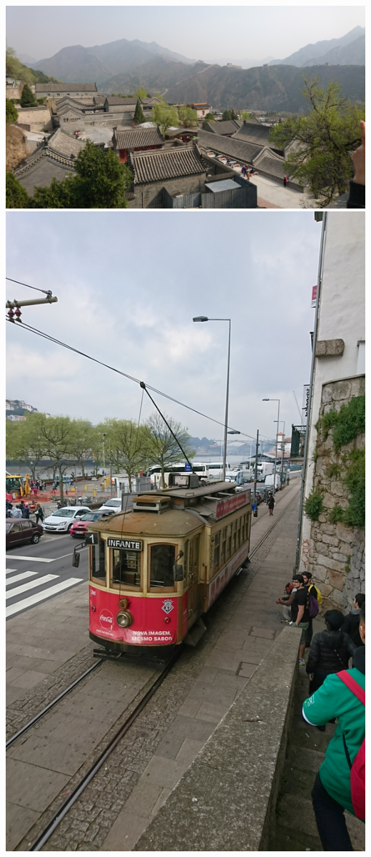 \documentclass{beamer}
\begin{document}
\begin{frame}
\begin{columns}
  \includegraphics[width=1\textwidth]{icpc/DSC_0171}
  \includegraphics[width=1\textwidth]{icpc/DSC_0677}
\end{columns}
\end{frame}


\end{document}
